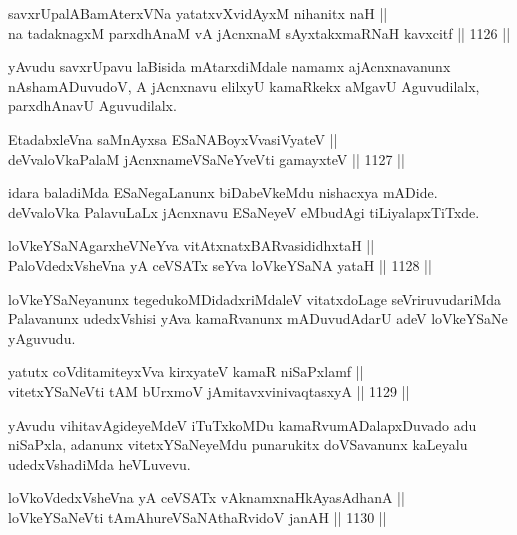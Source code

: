 \begin{shl}
savxrUpalABamAterxVNa yatatxvXvidAyxM nihanitx naH || \\
na tadaknagxM parxdhAnaM vA jAcnxnaM sAyxtakxmaRNaH kavxcitf \hfill || 1126 ||  
\end{shl}

\begin{artha}
yAvudu savxrUpavu laBisida mAtarxdiMdale namamx ajAcnxnavanunx nAshamADuvudoV, A jAcnxnavu elilxyU kamaRkekx aMgavU Aguvudilalx, parxdhAnavU Aguvudilalx.
\end{artha}

\begin{shl}
EtadabxleVna saMnAyxsa ESaNABoyxV\s vasiVyateV ||  \\
deVvaloVkaPalaM jAcnxnameVSaNeYveVti gamayxteV \hfill || 1127 ||  
\end{shl}

\begin{artha}
idara baladiMda ESaNegaLanunx biDabeVkeMdu nishacxya mADide. deVvaloVka PalavuLaLx jAcnxnavu ESaNeyeV eMbudAgi tiLiyalapxTiTxde.
\end{artha}

\begin{shl}
loVkeYSaNAgarxheVNeYva vitAtxnatxBARvasididhxtaH || \\
PaloVdedxVsheVna yA ceVSATx seYva loVkeYSaNA yataH \hfill || 1128 ||  
\end{shl}

\begin{artha}
loVkeYSaNeyanunx tegedukoMDidadxriMdaleV vitatxdoLage seVriruvudariMda Palavanunx udedxVshisi yAva kamaRvanunx mADuvudAdarU adeV loVkeYSaNe yAguvudu.
\end{artha}

\begin{shl}
yatutx coVditamiteyxVva kirxyateV kamaR niSaPxlamf || \\
vitetxYSaNeVti tAM bUrxmoV jAmitavxvinivaqtasxyA \hfill || 1129 ||  
\end{shl}

\begin{artha}
yAvudu vihitavAgideyeMdeV iTuTxkoMDu kamaRvu\break mADalapxDuvado adu niSaPxla, adanunx vitetxYSaNeyeMdu punarukitx doVSavanunx kaLeyalu udedxVshadiMda heVLuvevu.
\end{artha}


\begin{shl}
loVkoVdedxVsheVna yA ceVSATx vAknamxnaHkAyasAdhanA || \\
loVkeYSaNeVti tAmAhureVSaNAthaRvidoV janAH \hfill || 1130 ||  
\end{shl}

